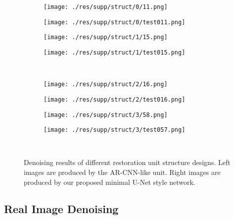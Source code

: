 \documentclass{article} %
\begin{document}
\begin{figure}[htp!]
	\centering
	
	\begin{subfigure}[t]{0.22\textwidth}
		\centering
		\texttt{[image: ./res/supp/struct/0/11.png]}
	\end{subfigure}
	\begin{subfigure}[t]{0.22\textwidth}
		\centering
		\texttt{[image: ./res/supp/struct/0/test011.png]}
	\end{subfigure}
	\hspace{2pt}
	\begin{subfigure}[t]{0.22\textwidth}
		\centering
		\texttt{[image: ./res/supp/struct/1/15.png]}
	\end{subfigure}
	\begin{subfigure}[t]{0.22\textwidth}
		\centering
		\texttt{[image: ./res/supp/struct/1/test015.png]}
	\end{subfigure}\\
	\begin{subfigure}[t]{0.22\textwidth}
		\centering
		\texttt{[image: ./res/supp/struct/2/16.png]}
	\end{subfigure}
	\begin{subfigure}[t]{0.22\textwidth}
		\centering
		\texttt{[image: ./res/supp/struct/2/test016.png]}
	\end{subfigure}
	\hspace{2pt}
	\begin{subfigure}[t]{0.22\textwidth}
		\centering
		\texttt{[image: ./res/supp/struct/3/58.png]}
	\end{subfigure}
	\begin{subfigure}[t]{0.22\textwidth}
		\centering
		\texttt{[image: ./res/supp/struct/3/test057.png]}
	\end{subfigure}\\
	
	\caption{Denoising results of different restoration unit structure designs.
		Left images are produced by the AR-CNN-like unit. Right images are produced
		by our proposed minimal U-Net style network.}
	\label{str}
\end{figure}


\subsection{Real Image Denoising}
\end{document}
